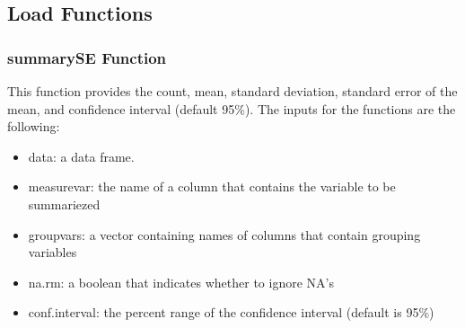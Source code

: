 \documentclass[]{article}
\providecommand{\tightlist}{%
  \setlength{\itemsep}{0pt}\setlength{\parskip}{0pt}}
\begin{document}
\subsection{Load Functions}\label{load-functions}

\subsubsection{summarySE Function}\label{summaryse-function}

This function provides the count, mean, standard deviation, standard
error of the mean, and confidence interval (default 95\%). The inputs
for the functions are the following:

\begin{itemize}
\tightlist
\item
  data: a data frame.
\item
  measurevar: the name of a column that contains the variable to be
  summariezed
\item
  groupvars: a vector containing names of columns that contain grouping
  variables
\item
  na.rm: a boolean that indicates whether to ignore NA's
\item
  conf.interval: the percent range of the confidence interval (default
  is 95\%)
\end{itemize}
\end{document}
